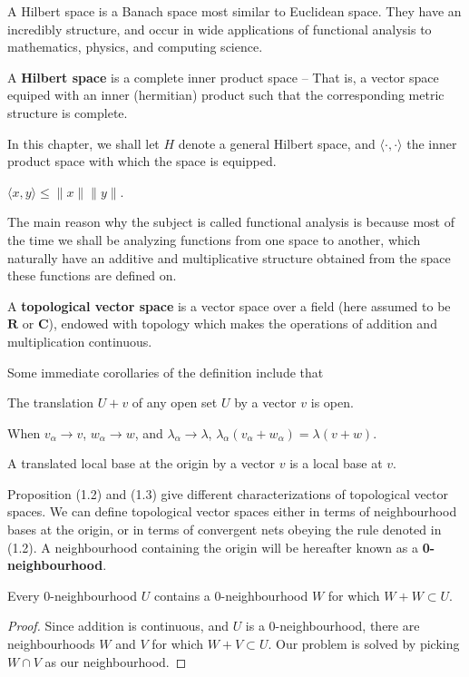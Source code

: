 A Hilbert space is a Banach space most similar to Euclidean space. They have an incredibly structure, and occur in wide applications of functional analysis to mathematics, physics, and computing science.

\begin{definition}
    A {\bf Hilbert space} is a complete inner product space -- That is, a vector space equiped with an inner (hermitian) product such that the corresponding metric structure is complete.
\end{definition}

In this chapter, we shall let $H$ denote a general Hilbert space, and $\langle \cdot, \cdot \rangle$ the inner product space with which the space is equipped.

\begin{theorem}
    $\langle x, y \rangle \leq \| x \| \| y \|$.
\end{theorem}

The main reason why the subject is called functional analysis is because most of the time we shall be analyzing functions from one space to another, which naturally have an additive and multiplicative structure obtained from the space these functions are defined on.

\begin{definition}
    A {\bf topological vector space} is a vector space over a field (here assumed to be $\mathbf{R}$ or $\mathbf{C}$), endowed with  topology which makes the operations of addition and multiplication continuous.
\end{definition}

Some immediate corollaries of the definition include that

\begin{prop}
    The translation $U + v$ of any open set $U$ by a vector $v$ is open.
\end{prop}
\begin{prop}
    When $v_\alpha \to v$, $w_\alpha \to w$, and $\lambda_\alpha \to \lambda$, $\lambda_\alpha (v_\alpha + w_\alpha) = \lambda ( v + w)$.
\end{prop}
\begin{prop}
    A translated local base at the origin by a vector $v$ is a local base at $v$.
\end{prop}
%
Proposition (1.2) and (1.3) give different characterizations of topological vector spaces. We can define topological vector spaces either in terms of neighbourhood bases at the origin, or in terms of convergent nets obeying the rule denoted in (1.2). A neighbourhood containing the origin will be hereafter known as a {\bf 0-neighbourhood}.
%
\begin{lemma}
    Every 0-neighbourhood $U$ contains a 0-neighbourhood $W$ for which $W + W \subset U$.
\end{lemma}
\begin{proof}
    Since addition is continuous, and $U$ is a 0-neighbourhood, there are neighbourhoods $W$ and $V$ for which $W + V \subset U$. Our problem is solved by picking $W \cap V$ as our neighbourhood.
\end{proof}

